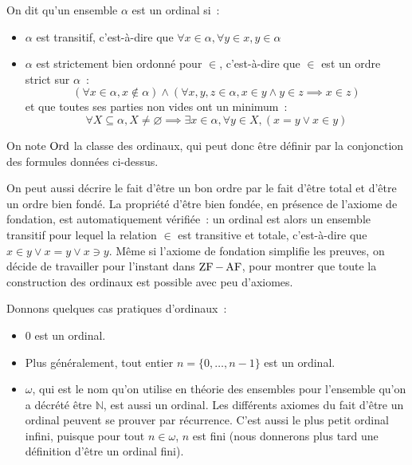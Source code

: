 \begin{definition}[Ordinal]
  On dit qu'un ensemble $\alpha$ est un ordinal si~:
  \begin{itemize}
  \item $\alpha$ est transitif, c'est-à-dire que
    $\forall x\in \alpha, \forall y \in x, y\in \alpha$
  \item $\alpha$ est strictement bien ordonné pour $\in$, c'est-à-dire que 
    $\in$ est un ordre strict sur $\alpha$~:
    \[(\forall x\in \alpha, x\notin \alpha)\land (\forall x,y,z\in \alpha,
    x\in y \land y \in z \implies x \in z)\]
    et que toutes ses parties non vides ont un minimum~:
    \[\forall X\subseteq \alpha, X\neq\varnothing\implies
    \exists x \in \alpha, \forall y \in X, (x=y \lor x \in y)\]
  \end{itemize}

  On note $\operatorname{Ord}$ la classe des ordinaux, qui peut donc être définir par la
  conjonction des formules données ci-dessus.
\end{definition}

\begin{remark}
  On peut aussi décrire le fait d'être un bon ordre par le fait d'être total
  et d'être un ordre bien fondé. La propriété d'être bien fondée, en présence
  de l'axiome de fondation, est automatiquement vérifiée~: un ordinal est alors
  un ensemble transitif pour lequel la relation $\in$ est transitive et totale,
  c'est-à-dire que $x\in y \lor x = y \lor x\ni y$. Même si l'axiome de
  fondation simplifie les preuves, on décide de travailler pour l'instant dans
  $\operatorname{ZF} - \operatorname{AF}$, pour montrer que toute la construction des ordinaux est possible
  avec peu d'axiomes.
\end{remark}

\begin{example}
  Donnons quelques cas pratiques d'ordinaux~:
  \begin{itemize}
  \item $0$ est un ordinal.
  \item Plus généralement, tout entier $n = \{0,\ldots,n-1\}$ est un ordinal.
  \item $\omega$, qui est le nom qu'on utilise en théorie des ensembles pour
    l'ensemble qu'on a décrété être $\mathbb N$, est aussi un ordinal. Les
    différents axiomes du fait d'être un ordinal peuvent se prouver par
    récurrence. C'est aussi le plus petit ordinal infini, puisque pour tout
    $n\in \omega$, $n$ est fini (nous donnerons plus tard une définition d'être
    un ordinal fini).
  \end{itemize}
\end{example}

